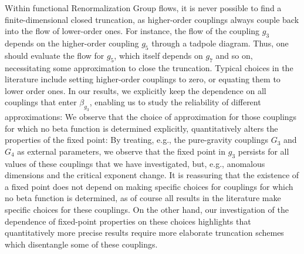 \documentclass[11pt]{book} %
\begin{document}
 Within functional Renormalization Group flows, it is never possible to find a finite-dimensional closed truncation, as higher-order couplings always couple back into the flow of lower-order ones. For instance, the flow of the coupling $g_3$ depends on the higher-order coupling $g_5$ through a tadpole diagram. Thus, one should evaluate the flow for $g_5$, which itself depends on $g_7$ and so on, necessitating some approximation to close the truncation. Typical choices in the literature include setting higher-order couplings to zero, or equating them to lower order ones. In our results, we explicitly keep the dependence on all couplings that enter $\beta_{g_3}$, enabling us to study the reliability of different approximations:
We observe that the choice of approximation for those couplings for which no beta function is determined explicitly, quantitatively alters the properties of the fixed point: By treating, e.g., the pure-gravity couplings $G_3$ and $G_4$ as external parameters, we observe that the fixed point in $g_3$ persists for all values of these couplings that we have investigated, but, e.g., anomalous dimensions and the critical exponent change. It is reassuring that the existence of a fixed point does not  depend on making specific choices for couplings for which no beta function is determined, as of course all results in the literature make specific choices for these couplings. On the other hand, our investigation of the dependence of fixed-point properties on these choices highlights that quantitatively more precise results require
 more elaborate truncation schemes which disentangle some of these couplings.
\end{document}
